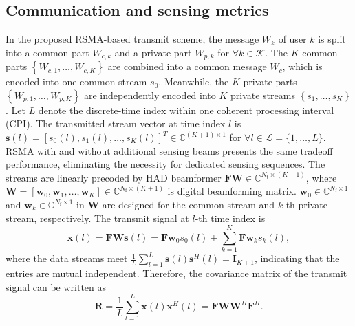 \documentclass[10pt,journal,twocolumn]{IEEEtran}
\begin{document}
\subsection{Communication  and sensing metrics}
In the proposed  RSMA-based transmit scheme, the message $W_k$ of user $k$ is split into a common part $W_{c,k}$ and a private part $W_{p,k}$ for $\forall k\in\mathcal{K}$. The $K$ common parts  $\left\{W_{c,1},\dots,W_{c,K}\right\}$ are combined into a  common message $W_c$, which is encoded into one common stream $s_{0}$. Meanwhile, the $K$ private parts $\left\{W_{p,1},\dots, W_{p,K}\right\}$ are independently encoded into $K$ private streams $\left\{s_{1},\dots,s_{K}\right\}$. Let $L$ denote the discrete-time index within one coherent processing interval (CPI). The transmitted stream vector at time index $l$ is $\mathbf{s}\left(l\right)=\left[s_0(l),s_1(l),\dots,s_K(l)\right]^T\in\mathbb{C}^{(K+1)\times 1}$ for $\forall l\in\mathcal{L}=\{1,\dots, L\}$. RSMA with and without additional sensing beams presents the same tradeoff performance, eliminating the necessity for dedicated sensing sequences\cite{9531484}. The streams are linearly precoded by HAD beamformer $\mathbf{F}\mathbf{W}\in\mathbb{C}^{N_{\text{t}}\times (K+1)}$, where $\mathbf{W}=\left[\mathbf{w}_0,\mathbf{w}_1,\dots,\mathbf{w}_K\right]\in\mathbb{C}^{N_{\text{f}}\times (K+1)}$ is digital beamforming matrix. $\mathbf{w}_0\in\mathbb{C}^{N_{\text{f}}\times 1}$ and $\mathbf{w}_k\in\mathbb{C}^{N_{\text{f}}\times 1}$ in $\mathbf{W}$ are designed for the common stream and $k$-th private stream, respectively. The transmit signal at $l$-th time index is  
\begin{equation}
\mathbf{x}\left(l\right)=\mathbf{F}\mathbf{W}\mathbf{s}(l)=\mathbf{F}\mathbf{w}_0s_0\left(l\right) + \sum_{k=1}^{K}{\mathbf{F}\mathbf{w}_ks_k\left(l\right)},
\label{transmit_signal}
\end{equation}
where the data streams meet $\frac{1}{L}\sum_{l=1}^{L}\mathbf{s}(l)\mathbf{s}^H(l)=\mathbf{I}_{K+1}$, indicating that the entries are mutual independent. Therefore, the covariance matrix of the transmit signal can be written as
\begin{equation}
\mathbf{R}=\frac{1}{L}\sum_{l=1}^{L}\mathbf{x}(l)\mathbf{x}^H(l) =\mathbf{F}\mathbf{W}\mathbf{W}^H\mathbf{F}^H.
\end{equation}
\end{document}
